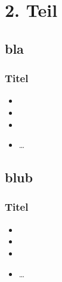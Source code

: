 \documentclass{beamer}
\begin{document}
\section{2. Teil}


\subsection{bla}

\begin{frame}
\frametitle{Titel}
\begin{itemize}\setlength{\itemsep}{+15pt}
  \item
  \item
  \item
  \item \ldots
\end{itemize}
\end{frame}


\subsection{blub}

\begin{frame}
\frametitle{Titel}
\begin{itemize}\setlength{\itemsep}{+15pt}
  \item
  \item
  \item
  \item \ldots
\end{itemize}
\end{frame}
\end{document}
